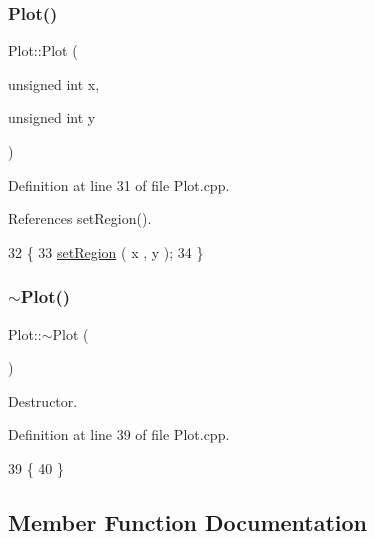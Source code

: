 \subsubsection{\texorpdfstring{Plot()}{Plot()}\hspace{0.1cm}{\footnotesize\ttfamily [2/2]}}
{\footnotesize\ttfamily Plot\+::\+Plot (\begin{DoxyParamCaption}\item[{unsigned int}]{x,  }\item[{unsigned int}]{y }\end{DoxyParamCaption})}



Definition at line 31 of file Plot.\+cpp.



References set\+Region().


\begin{DoxyCode}
32                             \{
33   \hyperlink{classPlot_a77a015d72e98d6fb066481e9c70af1ec}{setRegion} ( x , y );
34 \}
\end{DoxyCode}
\mbox{\label{classPlot_a277e9c79c4357b3a317d74d61dabefcf}} 
\subsubsection{\texorpdfstring{$\sim$\+Plot()}{~Plot()}}
{\footnotesize\ttfamily Plot\+::$\sim$\+Plot (\begin{DoxyParamCaption}{ }\end{DoxyParamCaption})\hspace{0.3cm}{\ttfamily [virtual]}}



Destructor. 



Definition at line 39 of file Plot.\+cpp.


\begin{DoxyCode}
39              \{ 
40 \} 
\end{DoxyCode}


\subsection{Member Function Documentation}
\mbox{\label{classPlot_ac0e03af81b0591d4786ff03441524eb2}} 
